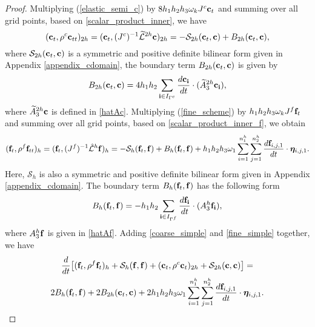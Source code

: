\begin{proof}
	Multiplying (\ref{elastic_semi_c}) by $8h_1h_2h_3\omega_kJ^{c}{\bf c}_t$ and summing over all grid points, based on \eqref{scalar_product_inner}, we have
	\begin{equation}\label{coarse_simple}
	({\bf c}_t, {\rho}^{c}{\bf c}_{tt})_{2h} = ({\bf c}_t,({J^c})^{-1}\wt{\mathcal{L}}^{2h}{\bf c})_{2h} = -\mathcal{S}_{2h}({\bf c}_t,{\bf c}) + B_{2h}({\bf c}_t,{{\bf c}}),
	\end{equation}
	where $\mathcal{S}_{2h}({\bf c}_t,{\bf c})$ is a symmetric and positive definite bilinear form given in Appendix \ref{appendix_cdomain}, the boundary term $B_{2h} ({\bf c}_t,{\bf c})$ is given by
	\begin{equation}\label{bounary_c1}
	B_{2h} ({\bf c}_t,{\bf c}) = 4h_1h_2\sum_{{\bf i}\in I_{\Gamma^c}}\frac{d{\bf c}_{\bf i}}{dt}\cdot (\wt{A}_3^{2h}{\bf c}_{\bf i}),
	\end{equation}
	where $\widetilde{A}_3^{2h} {\bf c}$ is defined in \eqref{hatAc}. Multiplying (\ref{fine_scheme}) by $h_1h_2h_3\omega_kJ^f{\bf f}_t$ and summing over all grid points, based on \eqref{scalar_product_inner_f}, we obtain
	\begin{equation}\label{fine_simple}
	({\bf f}_t, {\rho}^f{\bf f}_{tt})_h = ({\bf f}_t,({J^f})^{-1}\hat{\mathcal{L}}^h{\bf f})_h = -\mathcal{S}_{h}({\bf f}_t,{\bf f}) + B_h({\bf f}_t,{\bf f}) 
	+h_1h_2h_3\omega_1\sum_{i = 1}^{n_1^h}\sum_{j=1}^{n_2^h} \frac{d{\bf f}_{i,j,1}}{dt}\cdot{\bm \eta}_{i,j,1}.
	\end{equation}
Here, $\mathcal{S}_h$ is also a symmetric and positive definite bilinear form given in Appendix \ref{appendix_cdomain}. The boundary term $B_h ({\bf f}_t,{\bf f})$ has the following form
	\begin{equation}\label{boundary_f1}
	B_h ({\bf f}_t,{\bf f}) = -h_1h_2\sum_{{\bf i}\in I_{\Gamma^f}}\frac{d{\bf f}_{\bf i}}{dt}\cdot(A_3^h {\bf f}_{\bf i}),
	\end{equation}
	where $A_3^h {\bf f}$ is given in \eqref{hatAf}. Adding \eqref{coarse_simple} and \eqref{fine_simple} together, we have
	\begin{multline}\label{semi_energy_1}
	\frac{d}{dt}\big[({\bf f}_t,\rho^f {\bf f}_t)_h + \mathcal{S}_{h}({\bf f},{\bf f}) + ({\bf c}_t,\rho^{c} {\bf c}_t)_{2h} + \mathcal{S}_{2h}({\bf c},{\bf c}) \big]  = \\
	2B_{h}({\bf f}_t,{\bf f}) + 2B_{2h}({\bf c}_t,{\bf c}) + 2h_1h_2h_3\omega_1\sum_{i = 1}^{n_1^h}\sum_{j=1}^{n_2^h}\frac{d{\bf f}_{i,j,1}}{dt}\cdot{\bm \eta}_{i,j,1}.

\end{multline}
\end{proof}
